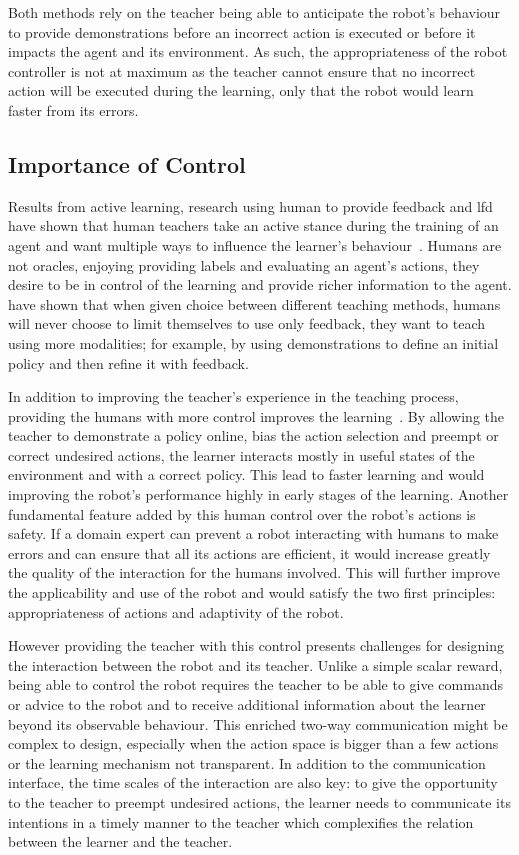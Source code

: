 Both methods rely on the teacher being able to anticipate the robot's behaviour to provide demonstrations before an incorrect action is executed or before it impacts the agent and its environment. As such, the appropriateness of the robot controller is not at maximum as the teacher cannot ensure that no incorrect action will be executed during the learning, only that the robot would learn faster from its errors.

\subsection{Importance of Control}

Results from active learning, research using human to provide feedback and \gls{lfd} have shown that human teachers take an active stance during the training of an agent and want multiple ways to influence the learner's behaviour~\citep{amershi2014power}. Humans are not oracles, enjoying providing labels and evaluating an agent's actions, they desire to be in control of the learning and provide richer information to the agent. \cite{kaochar2011towards} have shown that when given choice between different teaching methods, humans will never choose to limit themselves to use only feedback, they want to teach using more modalities; for example, by using demonstrations to define an initial policy and then refine it with feedback.

In addition to improving the teacher's experience in the teaching process, providing the humans with more control improves the learning~\citep{thomaz2008teachable,chernova2009interactive}. By allowing the teacher to demonstrate a policy online, bias the action selection and preempt or correct undesired actions, the learner interacts mostly in useful states of the environment and with a correct policy. This lead to faster learning and would improving the robot's performance highly in early stages of the learning. Another fundamental feature added by this human control over the robot's actions is safety. If a domain expert can prevent a robot interacting with humans to make errors and can ensure that all its actions are efficient, it would increase greatly the quality of the interaction for the humans involved. This will further improve the applicability and use of the robot and would satisfy the two first principles: appropriateness of actions and adaptivity of the robot.

However providing the teacher with this control presents challenges for designing the interaction between the robot and its teacher. Unlike a simple scalar reward, being able to control the robot requires the teacher to be able to give commands or advice to the robot and to receive additional information about the learner beyond its observable behaviour. This enriched two-way communication might be complex to design, especially when the action space is bigger than a few actions or the learning mechanism not transparent. In addition to the communication interface, the time scales of the interaction are also key: to give the opportunity to the teacher to preempt undesired actions, the learner needs to communicate its intentions in a timely manner to the teacher which complexifies the relation between the learner and the teacher. 


